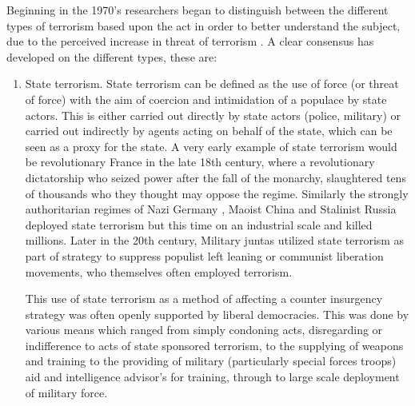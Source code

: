 Beginning in the 1970's researchers began to distinguish between the different types of terrorism based upon the act in order to better understand the subject, due to the perceived increase in threat of terrorism \citep{badey1998defining}. A clear consensus has developed on the different types, these are:
\begin{enumerate}
\item State terrorism. State terrorism can be defined as the use of force (or threat of force) with the aim of coercion and intimidation of a populace by state actors. This is either carried out directly by state actors (police, military) or carried out indirectly by agents acting on behalf of the state, which can be seen as a proxy for the state. A very early example of state terrorism would be revolutionary France in the late 18th century, where a revolutionary dictatorship who seized power after the fall of the monarchy, slaughtered tens of thousands who they thought may oppose the regime. Similarly the strongly authoritarian regimes of Nazi Germany \citep{gibbs1989conceptualization}, Maoist China and Stalinist Russia \citep{blakeley2009state} deployed state terrorism but this time on an industrial scale and killed millions. Later in the 20th century, Military juntas utilized  state terrorism as part of strategy to suppress populist left leaning or communist liberation movements, who themselves often employed terrorism. 

This use of state terrorism as a method of affecting a counter insurgency strategy was often openly supported by liberal democracies. This was done by various means which ranged from simply condoning acts, disregarding or indifference to acts of state sponsored terrorism, to the supplying of weapons and training to the providing of military (particularly special forces troops) aid and intelligence advisor's for training, through to large scale deployment of military force. 


\end{enumerate}
